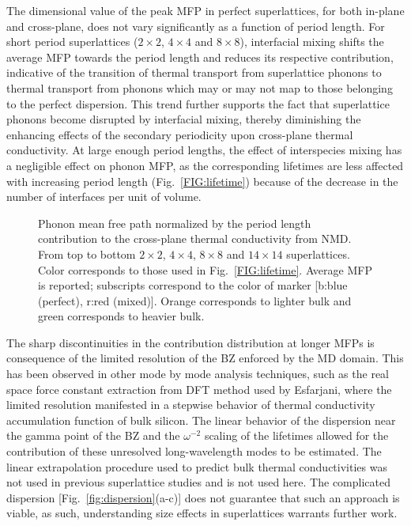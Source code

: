 \documentclass[aps,prb,preprint,preprintnumbers,amsmath,amssymb,floatfix,superscriptaddress]{revtex4}
\begin{document}
The dimensional value of the peak MFP in perfect superlattices, for both in-plane and cross-plane, does not vary significantly as a function of period length. For short period superlattices ($2\times2$, $4\times4$ and $8\times8$), interfacial mixing shifts the average MFP towards the period length and reduces its respective contribution, indicative of the transition of thermal transport from superlattice phonons to thermal transport from phonons which may or may not map to those belonging to the perfect dispersion. This trend further supports the fact that superlattice phonons become disrupted by interfacial mixing, thereby diminishing the enhancing effects of the secondary periodicity upon cross-plane thermal conductivity. At large enough period lengths, the effect of interspecies mixing has a negligible effect on phonon MFP, as the corresponding lifetimes are less affected with increasing period length (Fig.~\ref{FIG:lifetime}) because of the decrease in the number of interfaces per unit of volume. \cite{PhysRevB.79.075316}
\begin{figure}%
\begin{center}
\renewcommand{\figure}{Fig.}
\caption{Phonon mean free path normalized by the period length contribution to the cross-plane thermal conductivity from NMD. From top to bottom $2\times2$, $4\times4$, $8\times8$ and $14\times14$ superlattices. Color corresponds to those used in Fig.~\ref{FIG:lifetime}. Average MFP is reported; subscripts correspond to the color of marker [b:blue (perfect), r:red (mixed)]. Orange corresponds to lighter bulk and green corresponds to heavier bulk.}
\label{FIG:MFP_cp}
\end{center}
\end{figure}

The sharp discontinuities in the contribution distribution at longer MFPs is consequence of the limited resolution of the BZ enforced by the MD domain. This has been observed in other mode by mode analysis techniques, such as the real space force constant extraction from DFT method used by Esfarjani, where the limited resolution manifested in a stepwise behavior of thermal conductivity accumulation function of bulk silicon. \cite{PhysRevB.84.085204} The linear behavior of the dispersion near the gamma point of the BZ and the $\omega^{-2}$ scaling of the lifetimes allowed for the contribution of these unresolved long-wavelength modes to be estimated. The linear extrapolation procedure used to predict bulk thermal conductivities \cite{PhysRevB.81.214305} was not used in previous superlattice studies \cite{doi:10.1021/nl202186y,Luckyanova16112012} and is not used here. The complicated dispersion [Fig.~\ref{fig:dispersion}(a-c)] does not guarantee that such an approach is viable, as such, understanding size effects in superlattices warrants further work.
\end{document}

